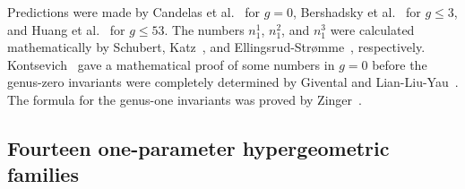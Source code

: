\documentclass[10pt,oldfontcommands,oneside]{memoir}
\theoremstyle{definition}
\theoremstyle{remark}
\theoremstyle{plain}
\theoremstyle{definition}
\theoremstyle{remark}
\newcommand{\1}{\mathbf{1}}
\newcommand{\2}{\mathbf{2}}
\newcommand{\3}{\mathbf{3}}
\begin{document}
Predictions were made by Candelas et al.~\cite{cdgp} for $g=0$, Bershadsky et al.~\cite{bcov} for $g \leq 3$, and Huang et al.~\cite{hkq} for $g \leq 53$.
The numbers $n_1^1$, $n_1^2$, and $n_1^3$ were calculated mathematically by Schubert, Katz~\cite{katz}, and Ellingsrud-Str{\o}mme~\cite{botteg}, respectively. Kontsevich~\cite{enumtorus} gave a mathematical proof of some numbers in $g=0$ before the genus-zero invariants were completely determined by Givental and Lian-Liu-Yau~\cite{eqgwinv,lly}. The formula for the genus-one invariants was proved by Zinger~\cite{reducedgenus1}.

\subsection{Fourteen one-parameter hypergeometric families}%
\label{sub:Fourteen one-parameter hypergeometric families}
\end{document}
